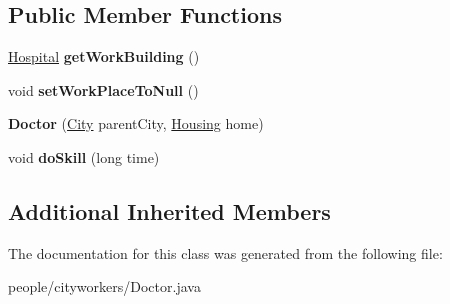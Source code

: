 \subsection*{Public Member Functions}
\begin{DoxyCompactItemize}
\item 
\hyperlink{classbuildings_1_1workplaces_1_1_hospital}{Hospital} {\bfseries get\+Work\+Building} ()\hypertarget{classpeople_1_1cityworkers_1_1_doctor_ad0224f690cc294657cdb40765ca2abb0}{}\label{classpeople_1_1cityworkers_1_1_doctor_ad0224f690cc294657cdb40765ca2abb0}

\item 
void {\bfseries set\+Work\+Place\+To\+Null} ()\hypertarget{classpeople_1_1cityworkers_1_1_doctor_acd7ab469d6569c5598b9d5871807ac7c}{}\label{classpeople_1_1cityworkers_1_1_doctor_acd7ab469d6569c5598b9d5871807ac7c}

\item 
{\bfseries Doctor} (\hyperlink{classcities_1_1_city}{City} parent\+City, \hyperlink{classbuildings_1_1housing_1_1_housing}{Housing} home)\hypertarget{classpeople_1_1cityworkers_1_1_doctor_a7be41ab6d785cf58fe20e17a43aa47f4}{}\label{classpeople_1_1cityworkers_1_1_doctor_a7be41ab6d785cf58fe20e17a43aa47f4}

\item 
void {\bfseries do\+Skill} (long time)\hypertarget{classpeople_1_1cityworkers_1_1_doctor_a912b54ab2b4adf280e3cff499f517b44}{}\label{classpeople_1_1cityworkers_1_1_doctor_a912b54ab2b4adf280e3cff499f517b44}

\end{DoxyCompactItemize}
\subsection*{Additional Inherited Members}


The documentation for this class was generated from the following file\+:\begin{DoxyCompactItemize}
\item 
people/cityworkers/Doctor.\+java\end{DoxyCompactItemize}
